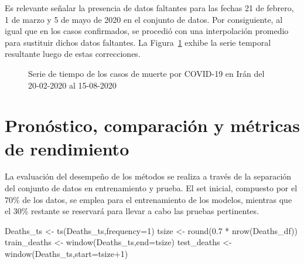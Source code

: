 \documentclass[
  letterpaper,
  DIV=11,
  numbers=noendperiod]{scrreport}
\newenvironment{Shaded}{\begin{snugshade}}{\end{snugshade}}
\newcommand{\AttributeTok}[1]{\textcolor[rgb]{0.40,0.45,0.13}{#1}}
\newcommand{\DecValTok}[1]{\textcolor[rgb]{0.68,0.00,0.00}{#1}}
\newcommand{\FloatTok}[1]{\textcolor[rgb]{0.68,0.00,0.00}{#1}}
\newcommand{\FunctionTok}[1]{\textcolor[rgb]{0.28,0.35,0.67}{#1}}
\newcommand{\NormalTok}[1]{\textcolor[rgb]{0.00,0.23,0.31}{#1}}
\newcommand{\OtherTok}[1]{\textcolor[rgb]{0.00,0.23,0.31}{#1}}
\newcommand{\SpecialCharTok}[1]{\textcolor[rgb]{0.37,0.37,0.37}{#1}}
\theoremstyle{plain}
\theoremstyle{definition}
\theoremstyle{definition}
\theoremstyle{plain}
\theoremstyle{remark}
\begin{document}
Es relevante señalar la presencia de datos faltantes para las fechas 21
de febrero, 1 de marzo y 5 de mayo de 2020 en el conjunto de datos. Por
consiguiente, al igual que en los casos confirmados, se procedió con una
interpolación promedio para sustituir dichos datos faltantes. La
Figura~\ref{fig-muertes} exhibe la serie temporal resultante luego de
estas correcciones.

\begin{figure}


\caption{\label{fig-muertes}Serie de tiempo de los casos de muerte por
COVID-19 en Irán del 20-02-2020 al 15-08-2020}

\end{figure}%

\section{Pronóstico, comparación y métricas de
rendimiento}\label{pronuxf3stico-comparaciuxf3n-y-muxe9tricas-de-rendimiento}

La evaluación del desempeño de los métodos se realiza a través de la
separación del conjunto de datos en entrenamiento y prueba. El set
inicial, compuesto por el \(70\%\) de los datos, se emplea para el
entrenamiento de los modelos, mientras que el \(30\%\) restante se
reservará para llevar a cabo las pruebas pertinentes.

\begin{Shaded}
\begin{Highlighting}[]
\NormalTok{Deaths\_ts }\OtherTok{\textless{}{-}} \FunctionTok{ts}\NormalTok{(Deaths\_ts,}\AttributeTok{frequency=}\DecValTok{1}\NormalTok{) }
\NormalTok{tsize }\OtherTok{\textless{}{-}} \FunctionTok{round}\NormalTok{(}\FloatTok{0.7} \SpecialCharTok{*} \FunctionTok{nrow}\NormalTok{(Deaths\_df)) }
\NormalTok{train\_deaths }\OtherTok{\textless{}{-}} \FunctionTok{window}\NormalTok{(Deaths\_ts,}\AttributeTok{end=}\NormalTok{tsize) }
\NormalTok{test\_deaths }\OtherTok{\textless{}{-}} \FunctionTok{window}\NormalTok{(Deaths\_ts,}\AttributeTok{start=}\NormalTok{tsize}\SpecialCharTok{+}\DecValTok{1}\NormalTok{)}
\end{Highlighting}
\end{Shaded}
\end{document}
